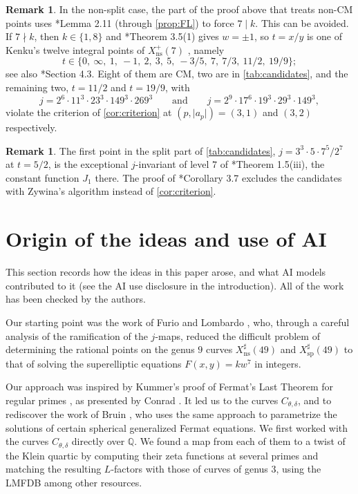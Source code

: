 \documentclass[12pt]{amsart}
\newcommand{\Q}{\mathbb{Q}}
\DeclareMathOperator{\ns}{ns}
\DeclareMathOperator{\spc}{sp}
\numberwithin{equation}{section}
\theoremstyle{definition}
\newtheorem{remark}[theorem]{Remark}
\begin{document}
\begin{remark}
  \label{rem:without-2.11}
  In the non-split case, the part of the proof above that treats non-CM points
  uses \cite{Furio--Lombardo26}*{Lemma 2.11} (through \cref{prop:FL}) to force $7 \mid k$.
  This can be avoided. If $7 \nmid k$, then
  $k \in \{1,8\}$ and \cite{Furio--Lombardo26}*{Theorem 3.5(1)} gives $w = \pm 1$, so $t
  = x/y$ is one of Kenku's twelve integral points of $X_{\ns}^{+}(7)$
  \cite{Kenku-85}, namely
  \[
    t \in \{0,\ \infty,\ 1,\ -1,\ 2,\ 3,\ 5,\ -3/5,\ 7,\ 7/3,\ 11/2,\ 19/9\};
  \]
  see also
  \cite{Elkies-99}*{Section 4.3}. Eight of them are CM, two are in
  \cref{tab:candidates}, and the remaining two, $t = 11/2$ and $t = 19/9$, with
  \[
    j = 2^{6}\cdot 11^{3}\cdot 23^{3}\cdot 149^{3}\cdot 269^{3}
    \qquad\text{and}\qquad
    j = 2^{9}\cdot 17^{6}\cdot 19^{3}\cdot 29^{3}\cdot 149^{3},
  \]
  violate the criterion of \cref{cor:criterion} at $(p,\lvert a_p\rvert) = (3,1)$
  and $(3,2)$ respectively.
\end{remark}

\begin{remark}
  The first point in the split part of \cref{tab:candidates}, $j = 3^3\cdot
  5\cdot 7^5/2^7$ at $t = 5/2$, is the exceptional $j$-invariant of level $7$ of
  \cite{Zywina-15}*{Theorem 1.5(iii)}, the constant function $J_1$ there. The proof
  of \cite{Furio--Lombardo26}*{Corollary 3.7} excludes the candidates with Zywina's algorithm
  \cite{Zywina-22} instead of \cref{cor:criterion}.
\end{remark}

\section{Origin of the ideas and use of AI}
\label{sec:ai}

This section records how the ideas in this paper arose, and what AI models
contributed to it (see the AI use disclosure in the introduction). All of the
work has been checked by the authors.

Our starting point was the work of Furio and Lombardo
\cite{Furio--Lombardo26}, who, through a careful analysis of the ramification
of the $j$-maps, reduced the difficult problem of determining the rational
points on the genus $9$ curves $X_{\ns}^{\sharp}(49)$ and
$X_{\spc}^{\sharp}(49)$ to that of solving the superelliptic equations
$F(x,y) = kw^7$ in integers.

Our approach was inspired by Kummer's proof of Fermat's Last Theorem for
regular primes \cite{Kummer-1850}, as presented by Conrad \cite{Conrad-FLT}.
It led us to the curves $C_{\theta,\delta}$, and to rediscover the work of
Bruin \cites{Bruin02-thesis,Bruin06-nn2}, who uses the same approach to
parametrize the solutions of certain spherical generalized Fermat equations. We
first worked with the curves $C_{\theta,\delta}$ directly over $\Q$. We found a
map from each of them to a twist of the Klein quartic by computing their zeta
functions at several primes and matching the resulting $L$-factors with those
of curves of genus $3$, using the LMFDB \cite{LMFDB} among other resources.
\end{document}
